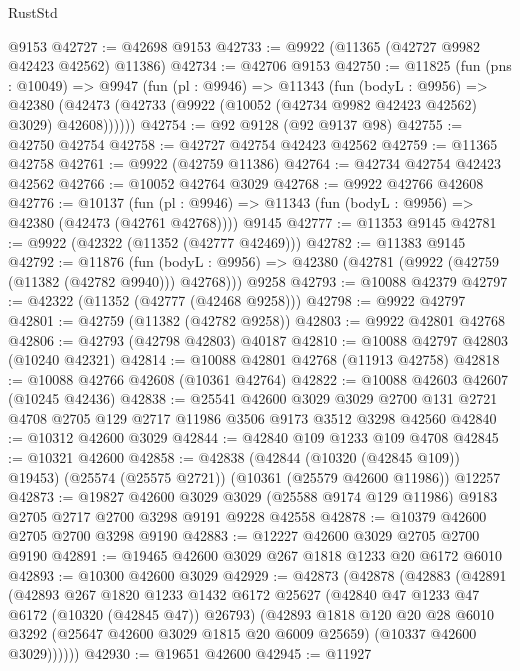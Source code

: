 \begin{lexlean}{RustStd}
\begin{coremodule}
    @9153
@42727 := @42698 @9153
@42733 := @9922 (@11365 (@42727 @9982 @42423 @42562) @11386)
@42734 := @42706 @9153
@42750 := @11825
    (fun (pns : @10049) =>
    @9947
      (fun (pl : @9946) =>
      @11343
        (fun (bodyL : @9956) =>
        @42380 (@42473 (@42733 (@9922 (@10052 (@42734 @9982 @42423 @42562) @3029) @42608))))))
@42754 := @92 @9128 (@92 @9137 @98)
@42755 := @42750 @42754
@42758 := @42727 @42754 @42423 @42562
@42759 := @11365 @42758
@42761 := @9922 (@42759 @11386)
@42764 := @42734 @42754 @42423 @42562
@42766 := @10052 @42764 @3029
@42768 := @9922 @42766 @42608
@42776 := @10137
    (fun (pl : @9946) => @11343 (fun (bodyL : @9956) => @42380 (@42473 (@42761 @42768))))
    @9145
@42777 := @11353 @9145
@42781 := @9922 (@42322 (@11352 (@42777 @42469)))
@42782 := @11383 @9145
@42792 := @11876
    (fun (bodyL : @9956) => @42380 (@42781 (@9922 (@42759 (@11382 (@42782 @9940))) @42768)))
    @9258
@42793 := @10088 @42379
@42797 := @42322 (@11352 (@42777 (@42468 @9258)))
@42798 := @9922 @42797
@42801 := @42759 (@11382 (@42782 @9258))
@42803 := @9922 @42801 @42768
@42806 := @42793 (@42798 @42803) @40187
@42810 := @10088 @42797 @42803 (@10240 @42321)
@42814 := @10088 @42801 @42768 (@11913 @42758)
@42818 := @10088 @42766 @42608 (@10361 @42764)
@42822 := @10088 @42603 @42607 (@10245 @42436)
@42838 := @25541
    @42600
    @3029
    @3029
    @2700
    @131
    @2721
    @4708
    @2705
    @129
    @2717
    @11986
    @3506
    @9173
    @3512
    @3298
    @42560
@42840 := @10312 @42600 @3029
@42844 := @42840 @109 @1233 @109 @4708
@42845 := @10321 @42600
@42858 := @42838
    (@42844 (@10320 (@42845 @109)) @19453)
    (@25574 (@25575 @2721))
    (@10361 (@25579 @42600 @11986))
    @12257
@42873 := @19827
    @42600
    @3029
    @3029
    (@25588 @9174 @129 @11986)
    @9183
    @2705
    @2717
    @2700
    @3298
    @9191
    @9228
    @42558
@42878 := @10379 @42600 @2705 @2700 @3298 @9190
@42883 := @12227 @42600 @3029 @2705 @2700 @9190
@42891 := @19465 @42600 @3029 @267 @1818 @1233 @20 @6172 @6010
@42893 := @10300 @42600 @3029
@42929 := @42873
    (@42878
      (@42883
        (@42891
          (@42893
            @267
            @1820
            @1233
            @1432
            @6172
            @25627
            (@42840 @47 @1233 @47 @6172 (@10320 (@42845 @47)) @26793)
            (@42893
              @1818
              @120
              @20
              @28
              @6010
              @3292
              (@25647 @42600 @3029 @1815 @20 @6009 @25659)
              (@10337 @42600 @3029))))))
@42930 := @19651 @42600
@42945 := @11927

\end{coremodule}
\end{lexlean}
